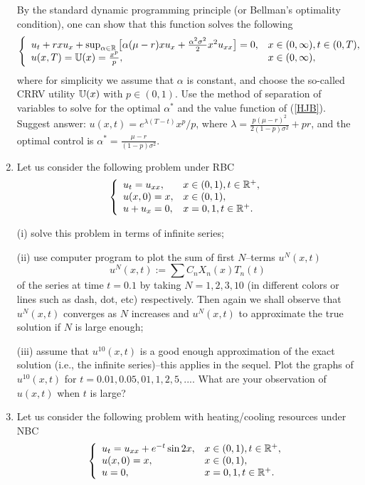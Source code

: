 \documentclass[6pt]{article}
\numberwithin{equation}{section}
\def\mathbb{\Bbb}
\begin{document}
\begin{enumerate}
By the standard dynamic programming principle (or Bellman's optimality condition), one can show that this function solves the following
\begin{equation}\label{HJB}
\left\{
\begin{array}{ll}
u_t+rxu_x+\sup_{\alpha\in\mathbb R}\big[\alpha(\mu-r)xu_x+\frac{\alpha^2\sigma^2}{2}x^2u_{xx}\big]=0,&x\in (0,\infty),t\in(0,T),\\
u(x,T)=\mathbb U(x)=\frac{x^p}{p},&x\in (0,\infty),
\end{array}
\right.
\end{equation}
where for simplicity we assume that $\alpha$ is constant, and choose the so-called CRRV utility $\mathbb U(x)$ with $p\in(0,1)$.  Use the method of separation of variables to solve for the optimal $\alpha^*$ and the value function of (\ref{HJB}).  Suggest answer: $u(x,t)=e^{\lambda(T-t)}x^p/p$, where $\lambda=\frac{p(\mu-r)^2}{2(1-p)\sigma^2}+pr$, and the optimal control is $\alpha^*=\frac{\mu-r}{(1-p)\sigma^2}$.

\item  Let us consider the following problem under RBC
\begin{equation}\label{NBVP1}
\left\{
\begin{array}{ll}
u_t=u_{xx},& x\in (0,1), t\in\mathbb R^+,\\
u(x,0)=x, &x\in(0,1), \\
u+u_x=0, & x=0,1, t\in\mathbb R^+.
\end{array}
\right.
\end{equation}

(i)  solve this problem in terms of infinite series;

(ii) use computer program to plot the sum of first $N$--terms $u^N(x,t)$
\[u^N(x,t):=\sum C_nX_n(x)T_n(t)\]
of the series at time $t=0.1$ by taking $N=1, 2, 3, 10$ (in different colors or lines such as dash, dot, etc) respectively.  Then again we shall observe that $u^N(x,t)$ converges as $N$ increases and $u^N(x,t)$ to approximate the true solution if $N$ is large enough;

(iii) assume that $u^{10}(x,t)$ is a good enough approximation of the exact solution (i.e., the infinite series)--this applies in the sequel.  Plot the graphs of $u^{10}(x,t)$ for $t=0.01,0.05,01,1,2,5,...$.   What are your observation of $u(x,t)$ when $t$ is large?


\item  Let us consider the following problem with heating/cooling resources under NBC
\begin{equation}\label{NBVP1}
\left\{
\begin{array}{ll}
u_t=u_{xx}+e^{-t}\sin 2x,& x\in (0,1), t\in\mathbb R^+,\\
u(x,0)=x, &x\in(0,1), \\
u=0, & x=0,1, t\in\mathbb R^+.
\end{array}
\right.
\end{equation}


\end{enumerate}
\end{document}
